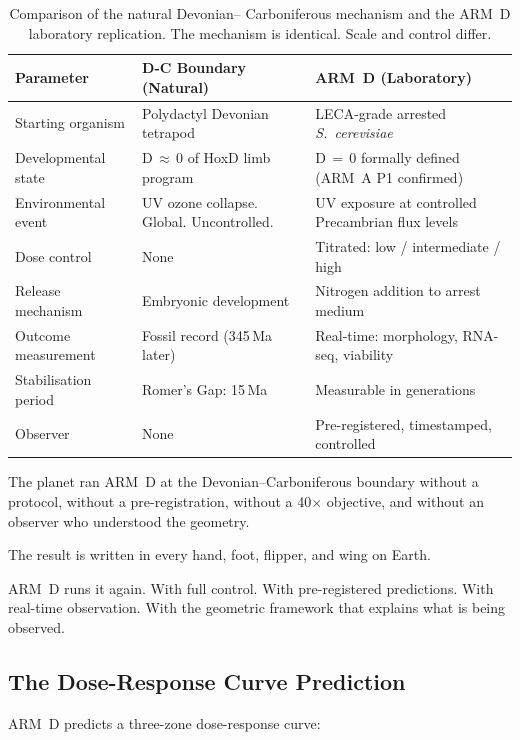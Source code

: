 \documentclass[11pt, a4paper]{article}
\begin{document}
\begin{table}[h]
\centering
\small
\begin{tabularx}{\linewidth}{p{3.2cm}p{4.3cm}p{4.3cm}}
\toprule
\textbf{Parameter} &
\textbf{D-C Boundary (Natural)} &
\textbf{ARM~D (Laboratory)} \\
\midrule
Starting organism &
  Polydactyl Devonian tetrapod &
  LECA-grade arrested
  \textit{S.~cerevisiae} \\[0.3em]
Developmental state &
  D\,$\approx$\,0 of HoxD limb program &
  D\,$=$\,0 formally defined (ARM~A
  P1 confirmed) \\[0.3em]
Environmental event &
  UV ozone collapse.
  Global. Uncontrolled. &
  UV exposure at controlled
  Precambrian flux levels \\[0.3em]
Dose control &
  None &
  Titrated: low / intermediate / high \\[0.3em]
Release mechanism &
  Embryonic development &
  Nitrogen addition to arrest medium \\[0.3em]
Outcome measurement &
  Fossil record (345\,Ma later) &
  Real-time: morphology, RNA-seq,
  viability \\[0.3em]
Stabilisation period &
  Romer's Gap: 15\,Ma &
  Measurable in generations \\[0.3em]
Observer &
  None &
  Pre-registered, timestamped,
  controlled \\
\bottomrule
\end{tabularx}
\caption{Comparison of the natural Devonian--
  Carboniferous mechanism and the ARM~D
  laboratory replication. The mechanism is
  identical. Scale and control differ.}
\end{table}

The planet ran ARM~D at the Devonian--Carboniferous
boundary without a protocol, without a pre-registration,
without a 40$\times$ objective, and without an observer
who understood the geometry.

The result is written in every hand, foot, flipper,
and wing on Earth.

ARM~D runs it again.
With full control.
With pre-registered predictions.
With real-time observation.
With the geometric framework that explains
what is being observed.

\subsection{The Dose-Response Curve Prediction}

ARM~D predicts a three-zone dose-response curve:
\end{document}
